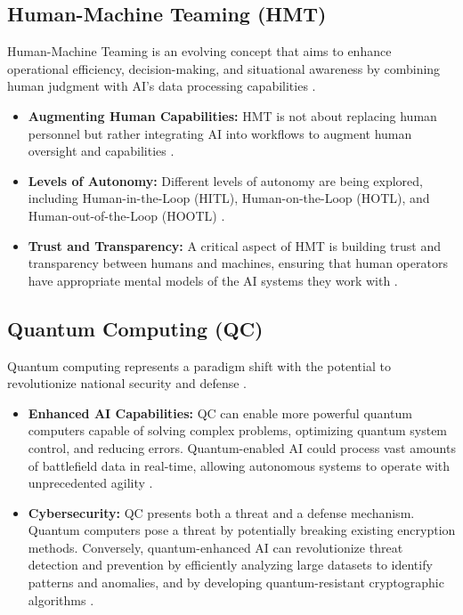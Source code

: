 \subsection{Human-Machine Teaming (HMT)}
Human-Machine Teaming is an evolving concept that aims to enhance operational efficiency, decision-making, and situational awareness by combining human judgment with AI's data processing capabilities \cite{TheAirPowerJournal_HMT}.
\begin{itemize}
    \item \textbf{Augmenting Human Capabilities:} HMT is not about replacing human personnel but rather integrating AI into workflows to augment human oversight and capabilities \cite{IrregularWarfareCenter_HMT}.
    \item \textbf{Levels of Autonomy:} Different levels of autonomy are being explored, including Human-in-the-Loop (HITL), Human-on-the-Loop (HOTL), and Human-out-of-the-Loop (HOOTL) \cite{IrregularWarfareCenter_HMT}.
    \item \textbf{Trust and Transparency:} A critical aspect of HMT is building trust and transparency between humans and machines, ensuring that human operators have appropriate mental models of the AI systems they work with \cite{WestPoint_HMT}.
\end{itemize}

\subsection{Quantum Computing (QC)}
Quantum computing represents a paradigm shift with the potential to revolutionize national security and defense \cite{QuantumZeitgeist_Quantum, Delinea_Quantum}.
\begin{itemize}
    \item \textbf{Enhanced AI Capabilities:} QC can enable more powerful quantum computers capable of solving complex problems, optimizing quantum system control, and reducing errors. Quantum-enabled AI could process vast amounts of battlefield data in real-time, allowing autonomous systems to operate with unprecedented agility \cite{CyberERP_Quantum}.
    \item \textbf{Cybersecurity:} QC presents both a threat and a defense mechanism. Quantum computers pose a threat by potentially breaking existing encryption methods. Conversely, quantum-enhanced AI can revolutionize threat detection and prevention by efficiently analyzing large datasets to identify patterns and anomalies, and by developing quantum-resistant cryptographic algorithms \cite{DARPA_Quantum, Taylors_Quantum}.
\end{itemize}

